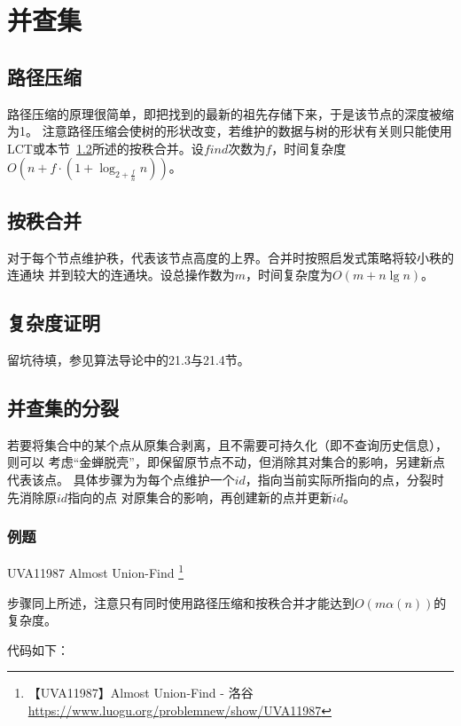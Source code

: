 \section{并查集}\label{DSU}
\subsection{路径压缩}
路径压缩的原理很简单，即把找到的最新的祖先存储下来，于是该节点的深度被缩为1。
注意路径压缩会使树的形状改变，若维护的数据与树的形状有关则只能使用
LCT或本节~\ref{RankMerge}所述的按秩合并。设$find$次数为$f$，时间复杂度
$O(n+f\cdot (1+\log_{2+\frac{f}{n}}n))$。
\subsection{按秩合并}\label{RankMerge}
对于每个节点维护秩，代表该节点高度的上界。合并时按照启发式策略将较小秩的连通块
并到较大的连通块。设总操作数为$m$，时间复杂度为$O(m+n\lg n)$。
\subsection{复杂度证明}
留坑待填，参见算法导论\cite{ITA3}中的21.3与21.4节。
\subsection{并查集的分裂}
若要将集合中的某个点从原集合剥离，且不需要可持久化（即不查询历史信息），则可以
考虑``金蝉脱壳''，即保留原节点不动，但消除其对集合的影响，另建新点代表该点。
具体步骤为为每个点维护一个$id$，指向当前实际所指向的点，分裂时先消除原$id$指向的点
对原集合的影响，再创建新的点并更新$id$。

\subsubsection{例题}

UVA11987 Almost Union-Find \footnote{
    【UVA11987】Almost Union-Find - 洛谷
    \url{https://www.luogu.org/problemnew/show/UVA11987}}

步骤同上所述，注意只有同时使用路径压缩和按秩合并才能达到$O(m\alpha(n))$的复杂度。

代码如下：

